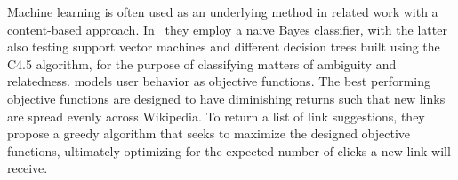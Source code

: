 Machine learning is often used as an underlying method in related work with a content-based approach. In~\cite{mihalcea2007wikify,milne2008learning} they employ a naive Bayes classifier, with the latter also testing support vector machines and different decision trees built using the C4.5 algorithm, for the purpose of classifying matters of ambiguity and relatedness. \cite{hyperlink-structure-using-logs} models user behavior as objective functions. The best performing objective functions are designed to have diminishing returns such that new links are spread evenly across Wikipedia. To return a list of link suggestions, they propose a greedy algorithm that seeks to maximize the designed objective functions, ultimately optimizing for the expected number of clicks a new link will receive.

